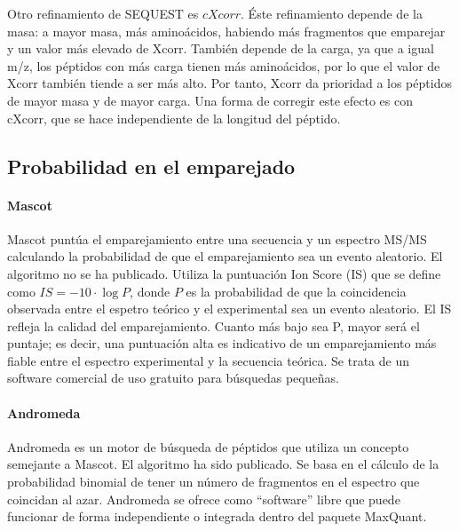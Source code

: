 Otro refinamiento de SEQUEST es $cXcorr$. Éste refinamiento depende de la masa: a mayor masa, más aminoácidos, habiendo más fragmentos que emparejar y un valor más elevado de Xcorr. También depende de la carga, ya que a igual m/z, los péptidos con más carga tienen más aminoácidos, por lo que el valor de Xcorr también tiende a ser más alto. Por tanto, Xcorr da prioridad a los péptidos de mayor masa y de mayor carga. Una forma de corregir este efecto es con cXcorr, que se hace independiente de la longitud del péptido.

\subsection{Probabilidad en el emparejado}
\paragraph{Mascot}
Mascot puntúa el emparejamiento entre una secuencia y un espectro MS/MS calculando la probabilidad de que el emparejamiento sea un evento aleatorio. El algoritmo no se ha publicado. Utiliza la puntuación Ion Score (IS) que se define como $IS = -10 \cdot \log P$, donde $P$ es la probabilidad de que la coincidencia observada entre el espetro teórico y el experimental sea un evento aleatorio. El IS refleja la calidad del emparejamiento. Cuanto más bajo sea P, mayor será el puntaje; es decir, una puntuación alta es indicativo de un emparejamiento más fiable entre el espectro experimental y la secuencia teórica. Se trata de un software comercial de uso gratuito para búsquedas pequeñas.

\paragraph{Andromeda}
Andromeda es un motor de búsqueda de péptidos que utiliza un concepto semejante a Mascot. El algoritmo ha sido publicado. Se basa en el cálculo de la probabilidad binomial de tener un número de fragmentos en el espectro que coincidan al azar. Andromeda se ofrece como “software” libre que puede funcionar de forma independiente o integrada dentro del paquete MaxQuant.